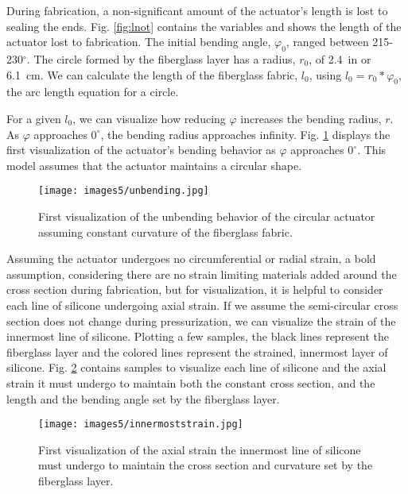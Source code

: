 During fabrication, a non-significant amount of the actuator's length is lost to sealing the ends. Fig. \ref{fig:lnot} contains the variables and shows the length of the actuator lost to fabrication. The initial bending angle, $\varphi_{0}$, ranged between 215-230$^\circ$. The circle formed by the fiberglass layer has a radius, $r_{0}$, of 2.4~in or 6.1~cm. We can calculate the length of the fiberglass fabric, $l_{0}$, using $l_{0} = r_{0}*\varphi_{0}$, the arc length equation for a circle. 

For a given $l_{0}$, we can visualize how reducing $\varphi$ increases the bending radius, $r$. As $\varphi$ approaches $0^\circ$, the bending radius approaches infinity. Fig. \ref{fig:unbending} displays the first visualization of the actuator's bending behavior as $\varphi$ approaches $0^\circ$. This model assumes that the actuator maintains a circular shape. 

\begin{figure}[h]
    \centering
    \texttt{[image: images5/unbending.jpg]}
    \caption{First visualization of the unbending behavior of the circular actuator assuming constant curvature of the fiberglass fabric.}
    \label{fig:unbending}
\end{figure}

Assuming the actuator undergoes no circumferential or radial strain, a bold assumption, considering there are no strain limiting materials added around the cross section during fabrication, but for visualization, it is helpful to consider each line of silicone undergoing axial strain. If we assume the semi-circular cross section does not change during pressurization, we can visualize the strain of the innermost line of silicone. Plotting a few samples, the black lines represent the fiberglass layer and the colored lines represent the strained, innermost layer of silicone. Fig. \ref{fig:innermoststrain} contains samples to visualize each line of silicone and the axial strain it must undergo to maintain both the constant cross section, and the length and the bending angle set by the fiberglass layer. 

\begin{figure}[h]
    \centering
    \texttt{[image: images5/innermoststrain.jpg]}
    \caption{First visualization of the axial strain the innermost line of silicone must undergo to maintain the cross section and curvature set by the fiberglass layer.}
    \label{fig:innermoststrain}
\end{figure}
